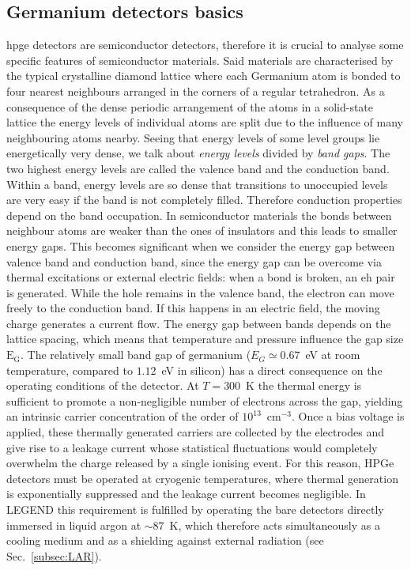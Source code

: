 \subsection{Germanium detectors basics}
\label{subsec:Ge-detector-basics}
\ac{hpge} detectors are semiconductor detectors, therefore it is crucial to analyse some specific features of semiconductor materials.
 Said materials are characterised by the typical crystalline diamond lattice where each Germanium atom is bonded to four nearest neighbours arranged in the corners of a regular tetrahedron. As a consequence of the dense periodic arrangement of the atoms in a solid-state lattice the energy levels of individual atoms are split due to the influence of many neighbouring atoms nearby. Seeing that energy levels of some level groups lie energetically very dense, we talk about \textit{energy levels} divided by \textit{band gaps}. 
The two highest energy levels are called the valence band and the conduction band. Within a band, energy levels are so dense that transitions to unoccupied levels are very easy if the band is not completely filled. Therefore conduction properties depend on the band occupation. In semiconductor materials the bonds between neighbour atoms are weaker than the ones of insulators and this leads to smaller energy gaps. This becomes significant when we consider the energy gap between valence band and conduction band, since the energy gap can be overcome via thermal excitations or external electric fields: when a bond is broken, an \ac{eh} pair is generated. While the hole remains in the valence band, the electron can move freely to the conduction band. If this happens in an electric field, the moving charge generates a current flow. The energy gap between bands depends on the lattice spacing, which means that temperature and pressure influence the gap size $\text{E}_\text{G}$.
The relatively small band gap of germanium ($E_G \simeq 0.67$~eV at room temperature, compared to $1.12$~eV in silicon) has a direct consequence on the operating conditions of the detector. At $T = 300$~K the thermal energy is sufficient to promote a non-negligible number of electrons across the gap, yielding an intrinsic carrier concentration of the order of $10^{13}$~cm$^{-3}$. Once a bias voltage is applied, these thermally generated carriers are collected by the electrodes and give rise to a leakage current whose statistical fluctuations would completely overwhelm the charge released by a single ionising event. For this reason, HPGe detectors must be operated at cryogenic temperatures, where thermal generation is exponentially suppressed and the leakage current becomes negligible. In LEGEND this requirement is fulfilled by operating the bare detectors directly immersed in liquid argon at $\sim 87$~K, which therefore acts simultaneously as a cooling medium and as a shielding against external radiation (see Sec.~\ref{subsec:LAR}).

